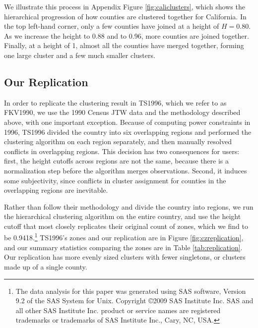 We illustrate this process in Appendix Figure \ref{fig:caliclusters}, which shows the hierarchical progression of how counties are clustered together for California. In the top left-hand corner, only a few counties have joined at a height of $H=0.80$. As we increase the height to 0.88 and to 0.96, more counties are joined together. Finally, at a height of 1, almost all the counties have merged together, forming one large cluster and a few much smaller clusters.

\subsection{Our Replication}
\FloatBarrier

In order to replicate the clustering result in TS1996, which we refer to as FKV1990, we use the 1990 Census JTW data and the methodology described above, with one important exception. Because of computing power constraints in 1996, TS1996 divided the country into six overlapping regions and performed the clustering algorithm on each region separately, and then manually resolved conflicts in overlapping regions. This decision has two consequences for users: first, the height cutoffs across regions are not the same, because there is a normalization step before the algorithm merges observations. Second, it induces some subjectivity, since conflicts in cluster assignment for counties in the overlapping regions are inevitable.

Rather than follow their methodology and divide the country into regions, we run the hierarchical clustering algorithm on the entire country, and use the height cutoff that most closely replicates their original count of zones, which we find to be 0.9418.\footnote{The data analysis for this paper was generated using SAS software, Version 9.2 of the SAS System for Unix. Copyright \copyright 2009 SAS Institute Inc. SAS and all other SAS Institute Inc. product or service names are registered trademarks or trademarks of SAS Institute Inc., Cary, NC, USA.} TS1996's zones and our replication are in Figure \ref{fig:czreplication}, and our summary statistics comparing the zones are in Table \ref{tab:replication}. Our replication has more evenly sized clusters with fewer singletons, or clusters made up of a single county.

